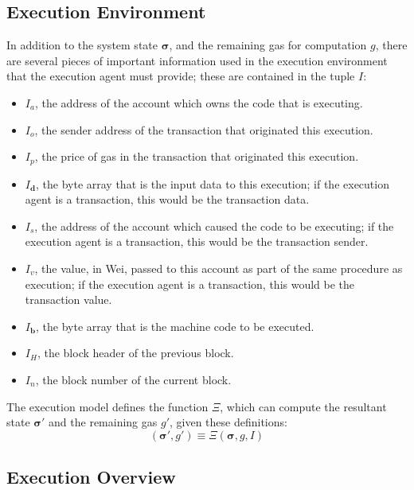 \documentclass[9pt,oneside]{amsart}
\begin{document}
\begin{multicols}{2}
\subsection{Execution Environment}

In addition to the system state $\boldsymbol{\sigma}$, and the remaining gas for computation $g$, there are several pieces of important information used in the execution environment that the execution agent must provide; these are contained in the tuple $I$:

\begin{itemize}
\item $I_a$, the address of the account which owns the code that is executing.
\item $I_o$, the sender address of the transaction that originated this execution.
\item $I_p$, the price of gas in the transaction that originated this execution.
\item $I_\mathbf{d}$, the byte array that is the input data to this execution; if the execution agent is a transaction, this would be the transaction data.
\item $I_s$, the address of the account which caused the code to be executing; if the execution agent is a transaction, this would be the transaction sender.
\item $I_v$, the value, in Wei, passed to this account as part of the same procedure as execution; if the execution agent is a transaction, this would be the transaction value.
\item $I_\mathbf{b}$, the byte array that is the machine code to be executed.
\item $I_H$, the block header of the previous block.
\item $I_n$, the block number of the current block.
\end{itemize}

The execution model defines the function $\Xi$, which can compute the resultant state $\boldsymbol{\sigma}'$ and the remaining gas $g'$, given these definitions:
\begin{equation}
(\boldsymbol{\sigma}', g') \equiv \Xi(\boldsymbol{\sigma}, g, I)
\end{equation}

\subsection{Execution Overview}


\end{multicols}
\end{document}

